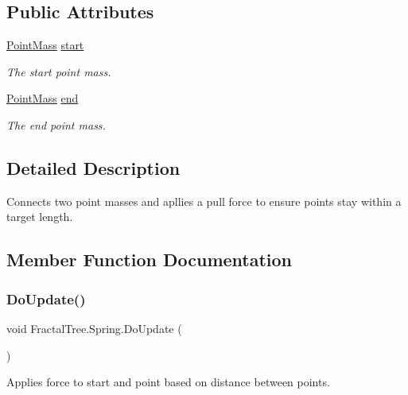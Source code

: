 \subsection*{Public Attributes}
\begin{DoxyCompactItemize}
\item 
\hyperlink{class_fractal_tree_1_1_point_mass}{Point\+Mass} \hyperlink{class_fractal_tree_1_1_spring_a4008f4f4f6404df50062047b0afa2ec8}{start}
\begin{DoxyCompactList}\small\item\em The start point mass. \end{DoxyCompactList}\item 
\hyperlink{class_fractal_tree_1_1_point_mass}{Point\+Mass} \hyperlink{class_fractal_tree_1_1_spring_a22f6b5200ab129728b9fbb06b5faca1f}{end}
\begin{DoxyCompactList}\small\item\em The end point mass. \end{DoxyCompactList}\end{DoxyCompactItemize}


\subsection{Detailed Description}
Connects two point masses and apllies a pull force to ensure points stay within a target length. 



\subsection{Member Function Documentation}
\mbox{\label{class_fractal_tree_1_1_spring_a38d6d4709c69509ef73c1725a53e470a}} 
\subsubsection{\texorpdfstring{Do\+Update()}{DoUpdate()}}
{\footnotesize\ttfamily void Fractal\+Tree.\+Spring.\+Do\+Update (\begin{DoxyParamCaption}{ }\end{DoxyParamCaption})}



Applies force to start and point based on distance between points. 

